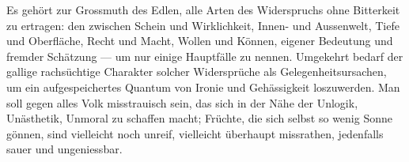 Es gehört zur Grossmuth des Edlen, alle Arten des Widerspruchs ohne Bitterkeit zu ertragen: den zwischen Schein und Wirklichkeit, Innen- und Aussenwelt, Tiefe und Oberfläche, Recht und Macht, Wollen und Können, eigener Bedeutung und fremder Schätzung — um nur einige Hauptfälle zu nennen. Umgekehrt bedarf der gallige rachsüchtige Charakter solcher Widersprüche als Gelegenheitsursachen, um ein aufgespeichertes Quantum von Ironie und Gehässigkeit loszuwerden. Man soll gegen alles Volk misstrauisch sein, das sich in der Nähe der Unlogik, Unästhetik, Unmoral zu schaffen macht; Früchte, die sich selbst so wenig Sonne gönnen, sind vielleicht noch unreif, vielleicht überhaupt missrathen, jedenfalls sauer und ungeniessbar.
\par

